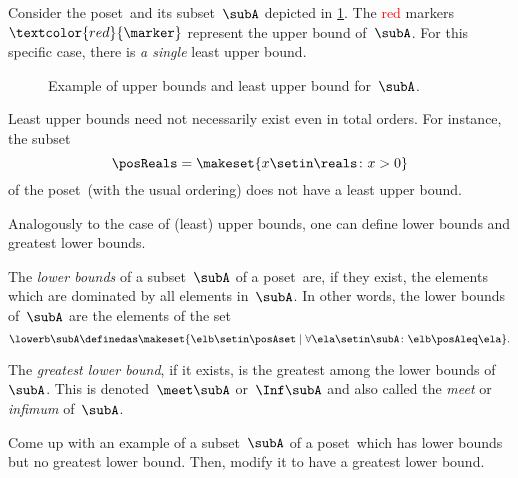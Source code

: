 \begin{example}
    Consider the poset~\posA and its subset~$\subA$ depicted in \cref{fig:upper_bound_example_bis}.
    The \textcolor{red}{red} markers~$\textcolor{red}{\marker}$ represent the upper bound of~$\subA$.
    For this specific case, there is \emph{a single} least upper bound.
\end{example}

\begin{figure}[h!]
    \caption{Example of upper bounds and least upper bound for~$\subA$.  \label{fig:upper_bound_example_bis}}
\end{figure}
\begin{example}
    Least upper bounds need not necessarily exist even in total orders.
    For instance, the subset
    \begin{equation}
        \posReals = \makeset{x\setin \reals \colon x>0}
    \end{equation}
    of the poset~\reals (with the usual ordering) does not have a least upper bound.
\end{example}

Analogously to the case of (least) upper bounds, one can define lower bounds and greatest lower bounds.

\begin{ctdefinition}
    \label{def:greatest-lower-bound}
    The \emph{lower bounds} of a subset~$\subA$ of a poset~\posA are, if they exist, the elements which are dominated by all elements in~$\subA$.
    In other words, the lower bounds of~$\subA$ are the elements of the set
    \begin{equation}
        \lowerb \subA\definedas \makeset{ \elb \setin \posAset \mid \forall \ela \setin \subA  \colon \elb \posAleq \ela }.
    \end{equation}
\end{ctdefinition}

\begin{ctdefinition}
    The \emph{greatest lower bound}, if it exists, is the greatest among the lower bounds of~$\subA$.
    This is denoted~$\meet \subA$ or~$\Inf \subA$ and also called the \emph{meet} or \emph{infimum} of~$\subA$.
\end{ctdefinition}

\begin{exercise}
    Come up with an example of a subset~$\subA$ of a poset~\posA which has lower bounds but no greatest lower bound.
    Then, modify it to have a greatest lower bound.
\end{exercise}

